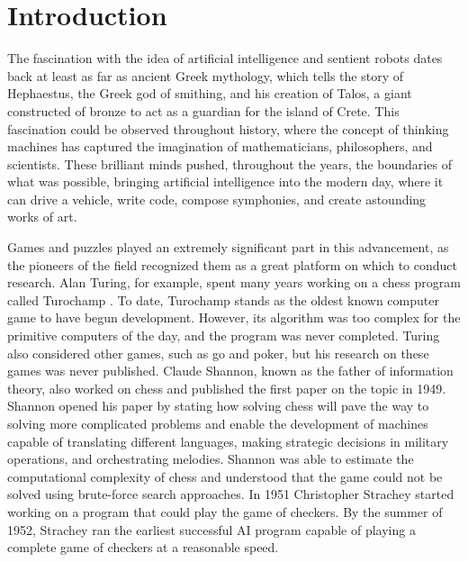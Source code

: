 \chapter{Introduction}

The fascination with the idea of artificial intelligence and sentient robots dates back at least as far as ancient Greek mythology, which tells the story of Hephaestus, the Greek god of smithing, and his creation of Talos, a giant constructed of bronze to act as a guardian for the island of Crete.
This fascination could be observed throughout history, where the concept of thinking machines has captured the imagination of mathematicians, philosophers, and scientists. These brilliant minds pushed, throughout the years, the boundaries of what was possible, bringing artificial intelligence into the modern day, where it can drive a vehicle, write code, compose symphonies, and create astounding works of art.

Games and puzzles played an extremely significant part in this advancement, as the pioneers of the field recognized them as a great platform on which to conduct research. Alan Turing, for example, spent many years working on a chess program called Turochamp \cite{turing1953digital}. To date, Turochamp stands as the oldest known computer game to have begun development. However, its algorithm was too complex for the primitive computers of the day, and the program was never completed. Turing also considered other games, such as go and poker, but his research on these games was never published. Claude Shannon, known as the father of information theory, also worked on chess and published the first paper \cite{shannon1950chess} on the topic in 1949. Shannon opened his paper by stating how solving chess will pave the way to solving more complicated problems and enable the development of machines capable of translating different languages, making strategic decisions in military operations, and orchestrating melodies. Shannon was able to estimate the computational complexity of chess and understood that the game could not be solved using brute-force search approaches. In 1951 Christopher Strachey started working on a program that could play the game of checkers. By the summer of 1952, Strachey ran the earliest successful AI program capable of playing a complete game of checkers at a reasonable speed. 

